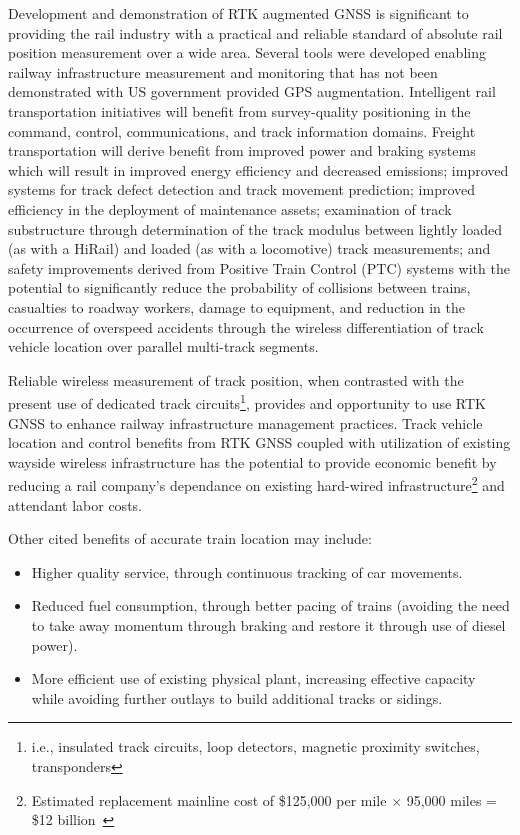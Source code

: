 Development and demonstration of RTK augmented GNSS is significant to providing the rail industry with a practical and reliable standard of absolute rail position measurement over a wide area. Several tools were developed enabling railway infrastructure measurement and monitoring that has not been demonstrated with US government provided GPS augmentation. Intelligent rail transportation initiatives will benefit from survey-quality positioning in the command, control, communications, and track information domains. Freight transportation will derive benefit from  improved power and braking systems which will result in improved energy efficiency and decreased emissions; improved systems for track defect detection and track movement prediction; improved efficiency in the deployment of maintenance assets; examination of track substructure through determination of the track modulus between lightly loaded (as with a HiRail) and loaded (as with a locomotive) track measurements; and safety improvements derived from Positive Train Control (PTC) systems with the potential to significantly reduce the probability of collisions between trains, casualties to roadway workers, damage to equipment, and reduction in the occurrence of overspeed accidents through the wireless differentiation of track vehicle location over parallel multi-track segments.

Reliable wireless measurement of track position, when contrasted with the present use of dedicated track circuits\footnote{i.e., insulated track circuits, loop detectors, magnetic proximity switches, transponders}, provides and opportunity to use RTK GNSS to enhance railway infrastructure management practices. Track vehicle location and control benefits from RTK GNSS coupled with utilization of existing wayside wireless infrastructure has the potential to provide economic benefit by reducing a rail company's dependance on existing hard-wired infrastructure\footnote{Estimated replacement mainline cost of \$125,000 per mile $\times$ 95,000 miles = \$12 billion~\citep{ResorPTC}} and attendant labor costs.

Other cited benefits of accurate train location may include:
\begin{itemize}
\firmlist
	\item Higher quality service, through continuous tracking of car movements.
	\item Reduced fuel consumption, through better pacing of trains (avoiding the need to take away momentum through braking and restore it through use of diesel power).
	\item More efficient use of existing physical plant, increasing effective capacity while avoiding further outlays to build additional tracks or sidings.~\citep[pp.12-13]{1995FRADiffe}
\end{itemize}


